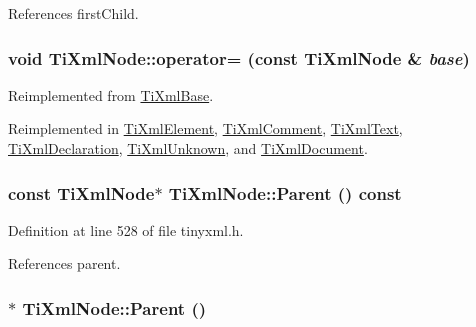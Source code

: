 References firstChild.\hypertarget{class_ti_xml_node_a9eb62a8d95b8a98ec2df481cc9e5a7e2}{
\subsubsection[{operator=}]{\setlength{\rightskip}{0pt plus 5cm}void TiXmlNode::operator= (const {\bf TiXmlNode} \& {\em base})}}
\label{class_ti_xml_node_a9eb62a8d95b8a98ec2df481cc9e5a7e2}


Reimplemented from \hyperlink{class_ti_xml_base_a183315aa6f1bb36d509b179e912cb93f}{TiXmlBase}.

Reimplemented in \hyperlink{class_ti_xml_element_af5cd4156e082ef3bf23adfe0ed173340}{TiXmlElement}, \hyperlink{class_ti_xml_comment_a46373f99b65cb960637dccb1f126bd49}{TiXmlComment}, \hyperlink{class_ti_xml_text_af5f15d40d048cea7cab9d0eb4fd8a7d2}{TiXmlText}, \hyperlink{class_ti_xml_declaration_a0fedc57539af9049be8db2d7d9d9ba33}{TiXmlDeclaration}, \hyperlink{class_ti_xml_unknown_a5097fe228cd5ad4edcdddf02c334fd83}{TiXmlUnknown}, and \hyperlink{class_ti_xml_document_aafbfacc3414008f619b1345775ef12a4}{TiXmlDocument}.\hypertarget{class_ti_xml_node_a78878709e53066f06eb4fcbcdd3a5260}{
\subsubsection[{Parent}]{\setlength{\rightskip}{0pt plus 5cm}const {\bf TiXmlNode}$\ast$ TiXmlNode::Parent () const}}
\label{class_ti_xml_node_a78878709e53066f06eb4fcbcdd3a5260}


Definition at line 528 of file tinyxml.h.

References parent.\hypertarget{class_ti_xml_node_ab643043132ffd794f8602685d34a982e}{
\subsubsection[{Parent}]{$\ast$ TiXmlNode::Parent ()}}
\label{class_ti_xml_node_ab643043132ffd794f8602685d34a982e}


